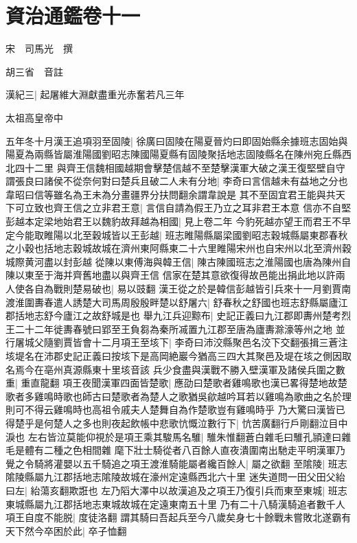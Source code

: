 \section{資治通鑑卷十一}
宋　司馬光　撰

胡三省　音註

漢紀三|{
	起屠維大淵獻盡重光赤奮若凡三年}


太祖高皇帝中

五年冬十月漢王追項羽至固陵|{
	徐廣曰固陵在陽夏晉灼曰即固始縣余據班志固始與陽夏為兩縣皆屬淮陽國劉昭志陳國陽夏縣有固陵聚括地志固陵縣名在陳州宛丘縣西北四十二里}
與齊王信魏相國越期會擊楚信越不至楚擊漢軍大破之漢王復堅壁自守謂張良曰諸侯不從奈何對曰楚兵且破二人未有分地|{
	李奇曰言信越未有益地之分也韋昭曰信等雖名為王未為分畫疆界分扶問翻余謂韋說是}
其不至固宜君王能與共天下可立致也齊王信之立非君王意|{
	言信自請為假王乃立之耳非君王本意}
信亦不自堅彭越本定梁地始君王以魏豹故拜越為相國|{
	見上卷二年}
今豹死越亦望王而君王不早定今能取睢陽以北至穀城皆以王彭越|{
	班志睢陽縣屬梁國劉昭志穀城縣屬東郡春秋之小穀也括地志穀城故城在濟州東阿縣東二十六里睢陽宋州也自宋州以北至濟州穀城際黄河盡以封彭越}
從陳以東傅海與韓王信|{
	陳古陳國班志之淮陽國也唐為陳州自陳以東至于海并齊舊地盡以與齊王信}
信家在楚其意欲復得故邑能出捐此地以許兩人使各自為戰則楚易破也|{
	易以豉翻}
漢王從之於是韓信彭越皆引兵來十一月劉賈南渡淮圍夀春遣人誘楚大司馬周殷殷畔楚以舒屠六|{
	舒春秋之舒國也班志舒縣屬廬江郡括地志舒今廬江之故舒城是也}
舉九江兵迎黥布|{
	史記正義曰九江郡即夀州楚考烈王二十二年徙夀春號曰郢至王負芻為秦所㓕置九江郡至唐為廬夀滁濠等州之地}
並行屠城父隨劉賈皆會十二月項王至垓下|{
	李奇曰沛洨縣聚邑名洨下交翻張揖三蒼注垓堤名在沛郡史記正義曰按垓下是高岡絶巖今猶高三四大其聚邑及堤在垓之側因取名焉今在亳州真源縣東十里垓音該}
兵少食盡與漢戰不勝入壁漢軍及諸侯兵圍之數重|{
	重直龍翻}
項王夜聞漢軍四面皆楚歌|{
	應劭曰楚歌者雞鳴歌也漢已畧得楚地故楚歌者多雞鳴時歌也師古曰楚歌者為楚人之歌猶吳歈越吟耳若以雞鳴為歌曲之名於理則可不得云雞鳴時也高祖令戚夫人楚舞自為作楚歌豈有雞鳴時乎}
乃大驚曰漢皆已得楚乎是何楚人之多也則夜起飲帳中悲歌忼慨泣數行下|{
	忼苦廣翻行戶剛翻泣目中淚也}
左右皆泣莫能仰視於是項王乘其駿馬名騅|{
	騅朱惟翻蒼白雜毛曰騅孔頴達曰雜毛是體有二種之色相間雜}
麾下壯士騎從者八百餘人直夜潰圍南出馳走平明漢軍乃覺之令騎將灌嬰以五千騎追之項王渡淮騎能屬者纔百餘人|{
	屬之欲翻}
至隂陵|{
	班志隂陵縣屬九江郡括地志隂陵故城在濠州定遠縣西北六十里}
迷失道問一田父田父紿曰左|{
	紿蕩亥翻欺誑也}
左乃䧟大澤中以故漢追及之項王乃復引兵而東至東城|{
	班志東城縣屬九江郡括地志東城故城在定遠東南五十里}
乃有二十八騎漢騎追者數千人項王自度不能脱|{
	度徒洛翻}
謂其騎曰吾起兵至今八歲矣身七十餘戰未嘗敗北遂霸有天下然今卒困於此|{
	卒子恤翻}
